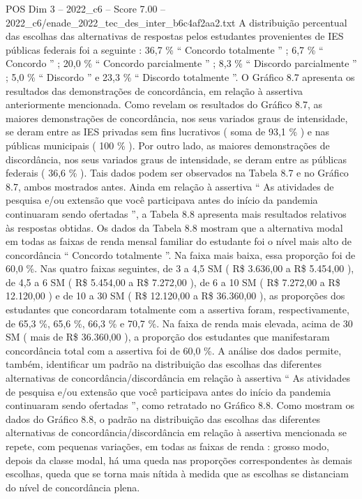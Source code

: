 \begin{textsample}{POS Dim 3 – 2022\_c6 – Score 7.00 – 2022\_c6/enade\_2022\_tec\_des\_inter\_b6c4af2aa2.txt}
A distribuição percentual das escolhas das alternativas de respostas pelos estudantes provenientes de IES públicas federais foi a seguinte : 36,7 \% “ Concordo totalmente ” ; 6,7 \% “ Concordo ” ; 20,0 \% “ Concordo parcialmente ” ; 8,3 \% “ Discordo parcialmente ” ; 5,0 \% “ Discordo ” e 23,3 \% “ Discordo totalmente ”.
O Gráfico 8.7 apresenta os resultados das demonstrações de concordância, em relação à assertiva anteriormente mencionada.
Como revelam os resultados do Gráfico 8.7, as maiores demonstrações de concordância, nos seus variados graus de intensidade, se deram entre as IES privadas sem fins lucrativos ( soma de 93,1 \% ) e nas públicas municipais ( 100 \% ).
Por outro lado, as maiores demonstrações de discordância, nos seus variados graus de intensidade, se deram entre as públicas federais ( 36,6 \% ).
Tais dados podem ser observados na Tabela 8.7 e no Gráfico 8.7, ambos mostrados antes.
Ainda em relação à assertiva “ As atividades de pesquisa e/ou extensão que você participava antes do início da pandemia continuaram sendo ofertadas ”, a Tabela 8.8 apresenta mais resultados relativos às respostas obtidas.
Os dados da Tabela 8.8 mostram que a alternativa modal em todas as faixas de renda mensal familiar do estudante foi o nível mais alto de concordância “ Concordo totalmente ”.
Na faixa mais baixa, essa proporção foi de 60,0 \%.
Nas quatro faixas seguintes, de 3 a 4,5 SM ( R\$ 3.636,00 a R\$ 5.454,00 ), de 4,5 a 6 SM ( R\$ 5.454,00 a R\$ 7.272,00 ), de 6 a 10 SM ( R\$ 7.272,00 a R\$ 12.120,00 ) e de 10 a 30 SM ( R\$ 12.120,00 a R\$ 36.360,00 ), as proporções dos estudantes que concordaram totalmente com a assertiva foram, respectivamente, de 65,3 \%, 65,6 \%, 66,3 \% e 70,7 \%.
Na faixa de renda mais elevada, acima de 30 SM ( mais de R\$ 36.360,00 ), a proporção dos estudantes que manifestaram concordância total com a assertiva foi de 60,0 \%.
A análise dos dados permite, também, identificar um padrão na distribuição das escolhas das diferentes alternativas de concordância/discordância em relação à assertiva “ As atividades de pesquisa e/ou extensão que você participava antes do início da pandemia continuaram sendo ofertadas ”, como retratado no Gráfico 8.8.
Como mostram os dados do Gráfico 8.8, o padrão na distribuição das escolhas das diferentes alternativas de concordância/discordância em relação à assertiva mencionada se repete, com pequenas variações, em todas as faixas de renda : grosso modo, depois da classe modal, há uma queda nas proporções correspondentes às demais escolhas, queda que se torna mais nítida à medida que as escolhas se distanciam do nível de concordância plena.

\end{textsample}
